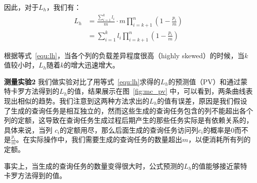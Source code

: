 因此，对于$L_h$，我们有：
\begin{equation}
\label{equ:lh}
\begin{split}
L_h &= \frac{\sum_{i=1}^{k} l_{i}}{m}  \cdot m \prod_{i=k+1}^{n}\left(1-\frac{p_{i}}{m}\right) \\
&= \sum_{i=1}^{k} l_{i} \prod_{i=k+1}^{n}\left(1-\frac{p_{i}}{m}\right)
\end{split}
\end{equation}

根据等式~\ref{equ:lh}，当各个列的负载差异程度很高（highly skewed）的时候，当$k$值较小时，$L_h$随着$k$的增大迅速增大。

\par \noindent \textbf{测量实验2} 我们做实验对比了用等式~\ref{equ:lh}求得的$L_h$的预测值（PV）和通过蒙特卡罗方法得到的$L_h$的值，结果展示在图~\ref{fig:mc_pv} 中，可以看到，两条曲线表现出相似的趋势。我们注意到这两种方法求出的$L_h$的值有误差，原因是我们假设了生成的查询任务是相互独立的，然而这些生成的查询任务包含的列不能超出各个列的定额，这导致在查询任务生成过程后期产生的那些任务实际是有依赖关系的，具体来说，当列 $c_i$的定额用尽，那么后面生成的查询任务访问列$c_i$的概率是$0$而不是$\frac{p_i}{m}$。在实际操作中，我们需要生成的查询任务的数量超出$m$，以便消耗所有列的定额。

\par 事实上，当生成的查询任务的数量变得很大时，公式预测的$L_h$的值能够接近蒙特卡罗方法得到的值。


